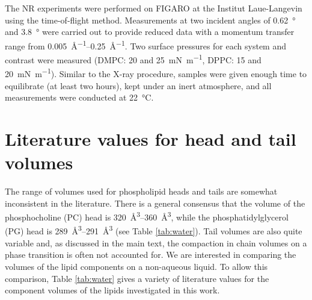\documentclass[11pt,a4paper]{paper}
\begin{document}
The NR experiments were performed on FIGARO at the Institut Laue-Langevin using the time-of-flight method.\cite{Campbell2011} Measurements at two incident angles of \SI{0.62}{\degree} and \SI{3.8}{\degree} were carried out to provide reduced data with a momentum transfer range from \SIrange{0.005}{0.25}{\AA^{-1}}. Two surface pressures for each system and contrast were measured (DMPC: 20 and \SI{25}{\milli\newton\meter^{-1}}, DPPC: 15 and \SI{20}{\milli\newton\meter^{-1}}). Similar to the X-ray procedure, samples were given enough time to equilibrate (at least two hours), kept under an inert atmosphere, and all measurements were conducted at \SI{22}{\celsius}.

\section{Literature values for head and tail volumes}
The range of volumes used for phospholipid heads and tails are somewhat inconsistent in the literature. There is a general consensus that the volume of the phosphocholine (PC) head is \SIrange{320}{360}{\cubic\angstrom}, while the phosphatidylglycerol (PG) head is \SIrange{289}{291}{\cubic\angstrom} (see Table \ref{tab:water}).
Tail volumes are also quite variable and, as discussed in the main text, the compaction in chain volumes on a phase transition is often not accounted for\cite{Campbell2018}.
We are interested in comparing the volumes of the lipid components on a non-aqueous liquid.
To allow this comparison, Table \ref{tab:water} gives a variety of literature values for the component volumes of the lipids investigated in this work.
\end{document}
